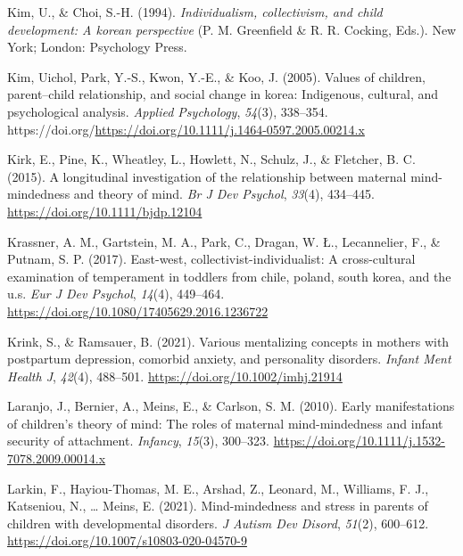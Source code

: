 \documentclass[
]{article}
\newlength{\cslhangindent}
\newlength{\cslentryspacingunit} %
\newenvironment{CSLReferences}[2] %
 {%
  \setlength{\parindent}{0pt}
  \ifodd #1
  \let\oldpar\par
  \def\par{\hangindent=\cslhangindent\oldpar}
  \fi
  \setlength{\parskip}{#2\cslentryspacingunit}
 }%
 {}
\begin{document}
\begin{CSLReferences}{1}{0}
\leavevmode{}%
Kim, U., \& Choi, S.-H. (1994). \emph{Individualism, collectivism, and child development: A korean perspective} (P. M. Greenfield \& R. R. Cocking, Eds.). New York; London: Psychology Press.

\leavevmode{}%
Kim, Uichol, Park, Y.-S., Kwon, Y.-E., \& Koo, J. (2005). Values of children, parent--child relationship, and social change in korea: Indigenous, cultural, and psychological analysis. \emph{Applied Psychology}, \emph{54}(3), 338--354. https://doi.org/\url{https://doi.org/10.1111/j.1464-0597.2005.00214.x}

\leavevmode{}%
Kirk, E., Pine, K., Wheatley, L., Howlett, N., Schulz, J., \& Fletcher, B. C. (2015). A longitudinal investigation of the relationship between maternal mind-mindedness and theory of mind. \emph{Br J Dev Psychol}, \emph{33}(4), 434--445. \url{https://doi.org/10.1111/bjdp.12104}

\leavevmode{}%
Krassner, A. M., Gartstein, M. A., Park, C., Dragan, W. Ł., Lecannelier, F., \& Putnam, S. P. (2017). East-west, collectivist-individualist: A cross-cultural examination of temperament in toddlers from chile, poland, south korea, and the u.s. \emph{Eur J Dev Psychol}, \emph{14}(4), 449--464. \url{https://doi.org/10.1080/17405629.2016.1236722}

\leavevmode{}%
Krink, S., \& Ramsauer, B. (2021). Various mentalizing concepts in mothers with postpartum depression, comorbid anxiety, and personality disorders. \emph{Infant Ment Health J}, \emph{42}(4), 488--501. \url{https://doi.org/10.1002/imhj.21914}

\leavevmode{}%
Laranjo, J., Bernier, A., Meins, E., \& Carlson, S. M. (2010). Early manifestations of children's theory of mind: The roles of maternal mind-mindedness and infant security of attachment. \emph{Infancy}, \emph{15}(3), 300--323. \url{https://doi.org/10.1111/j.1532-7078.2009.00014.x}

\leavevmode{}%
Larkin, F., Hayiou-Thomas, M. E., Arshad, Z., Leonard, M., Williams, F. J., Katseniou, N., \ldots{} Meins, E. (2021). Mind-mindedness and stress in parents of children with developmental disorders. \emph{J Autism Dev Disord}, \emph{51}(2), 600--612. \url{https://doi.org/10.1007/s10803-020-04570-9}


\end{CSLReferences}
\end{document}
